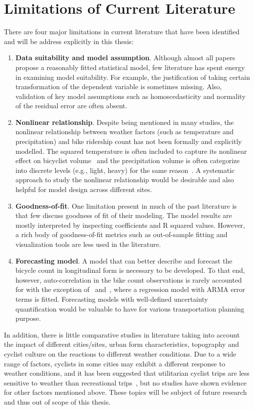 \documentclass [11pt, proquest] {uwthesis}[2015/03/03]
\begin{document}
\section{Limitations of Current Literature}
There are four major limitations in current literature that have been identified and will be address explicitly in this thesis:
\begin{enumerate}
    \item \textbf{Data suitability and model assumption}. Although almost all papers propose a reasonably fitted statistical model, few literature has spent energy in examining model suitability. For example, the justification of taking certain transformation of the dependent variable is sometimes missing. Also, validation of key model assumptions such as homoscedasticity and normality of the residual error are often absent.
    \item \textbf{Nonlinear relationship}. Despite being mentioned in many studies, the nonlinear relationship between weather factors (such as temperature and precipitation) and bike ridership count has not been formally and explicitly modelled. The squared temperature is often included to capture its nonlinear effect on bicyclist volume~\cite{Ahmed12,Rose07} and the precipitation volume is often categorize into discrete levels (e.g., light, heavy) for the same reason~\cite{Rose07,Thomas12}. A systematic approach to study the nonlinear relationship would be desirable and also helpful for model design across different sites.
    \item \textbf{Goodness-of-fit}. One limitation present in much of the past literature is that few discuss goodness of fit of their modeling. The model results are mostly interpreted by inspecting coefficients and R squared values. However, a rich body of goodness-of-fit metrics such as out-of-sample fitting and visualization tools are less used in the literature.
    \item \textbf{Forecasting model}. A model that can better describe and forecast the bicycle count in longitudinal form is necessary to be developed. To that end, however, auto-correlation in the bike count observations is rarely accounted for with the exception of~\cite{Gallop:2012aa} and~\cite{Nosal:2014aa}, where a regression model with ARMA error terms is fitted. Forecasting models with well-defined uncertainty quantification would be valuable to have for various transportation planning purpose.
\end{enumerate}
In addition, there is little comparative studies in literature taking into account the impact of different cities/sites, urban form characteristics, topography and cyclist culture on the reactions to different weather conditions. Due to a wide range of factors, cyclists in some cities may exhibit a different response to weather conditions, and it has been suggested that utilitarian cyclist trips are less sensitive to weather than recreational trips~\cite{Thomas:2009aa}, but no studies have shown evidence for other factors mentioned above. These topics will be subject of future research and thus out of scope of this thesis.
\end{document}
